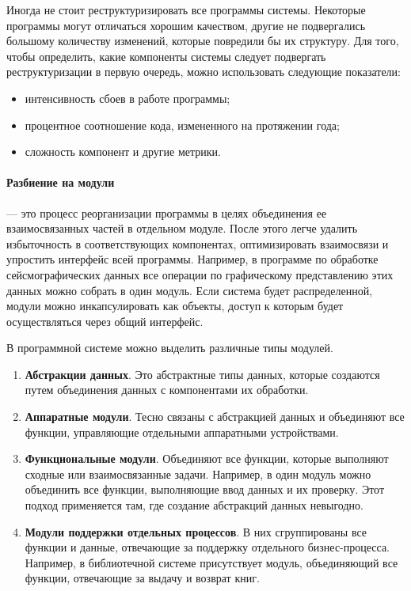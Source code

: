 \documentclass{../../text-style}
\begin{document}
Иногда не стоит реструктуризировать все программы системы. Некоторые программы могут отличаться хорошим качеством, другие не подвергались большому количеству изменений, которые повредили бы их структуру. Для того, чтобы определить, какие компоненты системы следует подвергать реструктуризации в первую очередь, можно использовать следующие показатели:

\begin{itemize}
    \item интенсивность сбоев в работе программы;
    \item процентное соотношение кода, измененного на протяжении года;
    \item сложность компонент и другие метрики.
\end{itemize}

\paragraph{Разбиение на модули} --- это процесс реорганизации программы в целях объединения ее взаимосвязанных частей в отдельном модуле. После этого легче удалить избыточность в соответствующих компонентах, оптимизировать взаимосвязи и упростить интерфейс всей программы. Например, в программе по обработке сейсмографических данных все операции по графическому представлению этих данных можно собрать в один модуль. Если система будет распределенной, модули можно инкапсулировать как объекты, доступ к которым будет осуществляться через общий интерфейс.

В программной системе можно выделить различные типы модулей.

\begin{enumerate}
    \item \textbf{Абстракции данных}. Это абстрактные типы данных, которые создаются путем объединения данных с компонентами их обработки. 
    \item \textbf{Аппаратные модули}. Тесно связаны с абстракцией данных и объединяют все функции, управляющие отдельными аппаратными устройствами.
    \item \textbf{Функциональные модули}. Объединяют все функции, которые выполняют сходные или взаимосвязанные задачи. Например, в один модуль можно объединить все функции, выполняющие ввод данных и их проверку. Этот подход применяется там, где создание абстракций данных невыгодно.
    \item \textbf{Модули поддержки отдельных процессов}. В них сгруппированы все функции и данные, отвечающие за поддержку отдельного бизнес-процесса. Например, в библиотечной системе присутствует модуль, объединяющий все функции, отвечающие за выдачу и возврат книг.
\end{enumerate}
\end{document}
